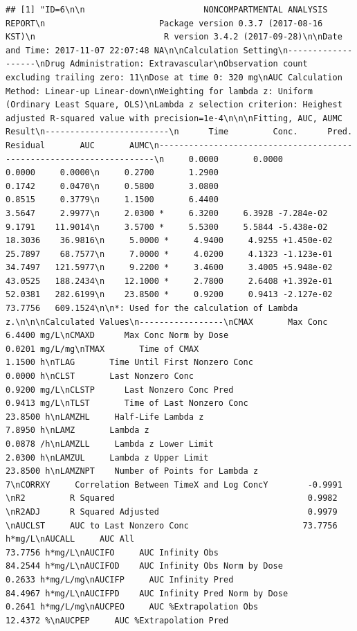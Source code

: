 \documentclass[12pt,]{krantz}
\theoremstyle{definition}
\theoremstyle{definition}
\theoremstyle{definition}
\theoremstyle{remark}
\begin{document}
\begin{verbatim}
## [1] "ID=6\n\n                        NONCOMPARTMENTAL ANALYSIS REPORT\n                       Package version 0.3.7 (2017-08-16 KST)\n                          R version 3.4.2 (2017-09-28)\n\nDate and Time: 2017-11-07 22:07:48 NA\n\nCalculation Setting\n-------------------\nDrug Administration: Extravascular\nObservation count excluding trailing zero: 11\nDose at time 0: 320 mg\nAUC Calculation Method: Linear-up Linear-down\nWeighting for lambda z: Uniform (Ordinary Least Square, OLS)\nLambda z selection criterion: Heighest adjusted R-squared value with precision=1e-4\n\n\nFitting, AUC, AUMC Result\n-------------------------\n      Time         Conc.      Pred.   Residual       AUC       AUMC\n---------------------------------------------------------------------\n     0.0000       0.0000                           0.0000     0.0000\n     0.2700       1.2900                           0.1742     0.0470\n     0.5800       3.0800                           0.8515     0.3779\n     1.1500       6.4400                           3.5647     2.9977\n     2.0300 *     6.3200     6.3928 -7.284e-02     9.1791    11.9014\n     3.5700 *     5.5300     5.5844 -5.438e-02    18.3036    36.9816\n     5.0000 *     4.9400     4.9255 +1.450e-02    25.7897    68.7577\n     7.0000 *     4.0200     4.1323 -1.123e-01    34.7497   121.5977\n     9.2200 *     3.4600     3.4005 +5.948e-02    43.0525   188.2434\n    12.1000 *     2.7800     2.6408 +1.392e-01    52.0381   282.6199\n    23.8500 *     0.9200     0.9413 -2.127e-02    73.7756   609.1524\n\n*: Used for the calculation of Lambda z.\n\n\nCalculated Values\n-----------------\nCMAX       Max Conc                                        6.4400 mg/L\nCMAXD      Max Conc Norm by Dose                           0.0201 mg/L/mg\nTMAX       Time of CMAX                                    1.1500 h\nTLAG       Time Until First Nonzero Conc                   0.0000 h\nCLST       Last Nonzero Conc                               0.9200 mg/L\nCLSTP      Last Nonzero Conc Pred                          0.9413 mg/L\nTLST       Time of Last Nonzero Conc                      23.8500 h\nLAMZHL     Half-Life Lambda z                              7.8950 h\nLAMZ       Lambda z                                        0.0878 /h\nLAMZLL     Lambda z Lower Limit                            2.0300 h\nLAMZUL     Lambda z Upper Limit                           23.8500 h\nLAMZNPT    Number of Points for Lambda z                   7\nCORRXY     Correlation Between TimeX and Log ConcY        -0.9991 \nR2         R Squared                                       0.9982 \nR2ADJ      R Squared Adjusted                              0.9979 \nAUCLST     AUC to Last Nonzero Conc                       73.7756 h*mg/L\nAUCALL     AUC All                                        73.7756 h*mg/L\nAUCIFO     AUC Infinity Obs                               84.2544 h*mg/L\nAUCIFOD    AUC Infinity Obs Norm by Dose                   0.2633 h*mg/L/mg\nAUCIFP     AUC Infinity Pred                              84.4967 h*mg/L\nAUCIFPD    AUC Infinity Pred Norm by Dose                  0.2641 h*mg/L/mg\nAUCPEO     AUC %Extrapolation Obs                         12.4372 %\nAUCPEP     AUC %Extrapolation Pred                        
\end{verbatim}
\end{document}
